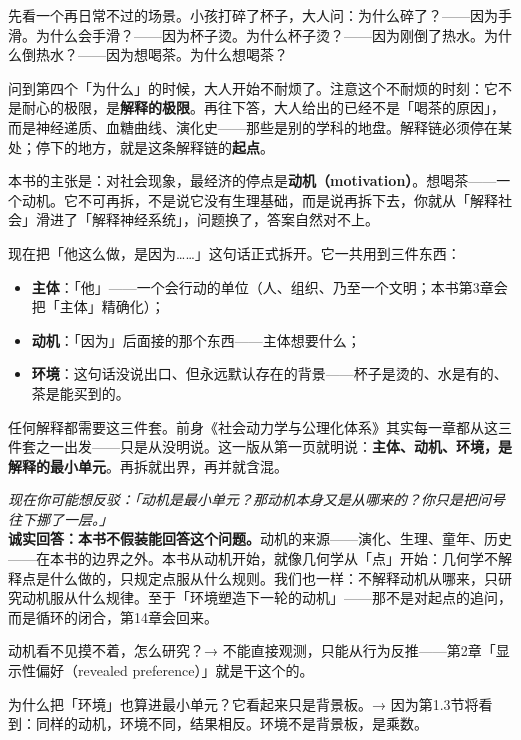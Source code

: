 \documentclass[../../main2.tex]{subfiles}
\begin{document}
	先看一个再日常不过的场景。小孩打碎了杯子，大人问：为什么碎了？——因为手滑。为什么会手滑？——因为杯子烫。为什么杯子烫？——因为刚倒了热水。为什么倒热水？——因为想喝茶。为什么想喝茶？

	问到第四个「为什么」的时候，大人开始不耐烦了。注意这个不耐烦的时刻：它不是耐心的极限，是\textbf{解释的极限}。再往下答，大人给出的已经不是「喝茶的原因」，而是神经递质、血糖曲线、演化史——那些是别的学科的地盘。解释链必须停在某处；停下的地方，就是这条解释链的\textbf{起点}。

	本书的主张是：对社会现象，最经济的停点是\textbf{动机（motivation）}。想喝茶——一个动机。它不可再拆，不是说它没有生理基础，而是说再拆下去，你就从「解释社会」滑进了「解释神经系统」，问题换了，答案自然对不上。

	现在把「他这么做，是因为……」这句话正式拆开。它一共用到三件东西：
	\begin{itemize}
		\item \textbf{主体}：「他」——一个会行动的单位（人、组织、乃至一个文明；本书第3章会把「主体」精确化）；
		\item \textbf{动机}：「因为」后面接的那个东西——主体想要什么；
		\item \textbf{环境}：这句话没说出口、但永远默认存在的背景——杯子是烫的、水是有的、茶是能买到的。
	\end{itemize}

	任何解释都需要这三件套。前身《社会动力学与公理化体系》其实每一章都从这三件套之一出发——只是从没明说。这一版从第一页就明说：\textbf{主体、动机、环境，是解释的最小单元}。再拆就出界，再并就含混。

	\begin{questionbox}
		\textit{现在你可能想反驳：「动机是最小单元？那动机本身又是从哪来的？你只是把问号往下挪了一层。」}\\
		\textbf{诚实回答：本书不假装能回答这个问题。}动机的来源——演化、生理、童年、历史——在本书的边界之外。本书从动机开始，就像几何学从「点」开始：几何学不解释点是什么做的，只规定点服从什么规则。我们也一样：不解释动机从哪来，只研究动机服从什么规律。至于「环境塑造下一轮的动机」——那不是对起点的追问，而是循环的闭合，第14章会回来。
	\end{questionbox}

	\begin{reader_anticipation}
		\item 动机看不见摸不着，怎么研究？→ 不能直接观测，只能从行为反推——第2章「显示性偏好（revealed preference）」就是干这个的。
		\item 为什么把「环境」也算进最小单元？它看起来只是背景板。→ 因为第1.3节将看到：同样的动机，环境不同，结果相反。环境不是背景板，是乘数。
	\end{reader_anticipation}
\end{document}
